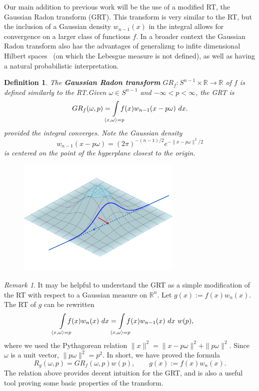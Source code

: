 \documentclass{amsart}
\newtheorem{definition}[theorem]{Definition}
\theoremstyle{remark}
\newtheorem{remark}[theorem]{Remark}
\numberwithin{equation}{section}
\newcommand{\RR}{\mathbb{R}}
\def\mclimits_#1{\limits_{\mathclap{#1}}}
\begin{document}
Our main addition to previous work will be the use of a modified RT, the Gaussian Radon transform (GRT). This transform is very similar to the RT, but the inclusion of a Gaussian density $w_{n-1}(x)$ in the integral allows for convergence on a larger class of functions $f$. In a broader context the Gaussian Radon transform also has the advantages of generalizng to infite dimensional Hilbert spaces~\cite{Seng14} (on which the Lebesgue measure is not defined), as well as having a natural probabilistic interpretation.


\begin{definition}
The \textbf{Gaussian Radon transform} $GR_f : S^{n-1} \times \RR \rightarrow \RR$ of $f$ is defined similarly to the RT.\@ Given $\omega \in S^{n-1}$ and $-\infty < p < \infty$, the GRT is
\[
    GR_f(\omega, p) = 
    \int\mclimits_{\langle x, \omega \rangle = p} f(x) w_{n-1}(x - p\omega) ~dx.
\]
provided the integral converges. Note the Gaussian density 
\[
    w_{n-1}(x - p\omega) = {(2\pi)}^{-(n-1)/2}e^{-\|x - p\omega\|^2/2}
\] 
is centered on the point of the hyperplane closest to the origin.
\end{definition}

\begin{figure}[h]
\includegraphics[width=0.7\textwidth]{geogebra-export.png}
\end{figure}

\begin{remark}
It may be helpful to understand the GRT as a simple modification of the RT with respect to a Gaussian measure on $\RR^n$. Let $g(x) := f(x)w_n(x)$. The RT of $g$ can be rewritten
\begin{align*}
    \int\mclimits_{\langle x, \omega \rangle = p} f(x) w_n(x) ~dx
    &= \int\mclimits_{\langle x, \omega \rangle = p} f(x) w_{n-1}(x) ~dx~ w(p),
\end{align*}
where we used the Pythagorean relation $\|x\|^2 = \|x - p\omega\|^2 + \|p\omega\|^2$. Since $\omega$ is a unit vector, $\|p\omega\|^2 = p^2$. In short, we have proved the formula
\begin{equation}
    \label{eq:GRTPythag}
    R_g(\omega, p) = GR_f(\omega, p) w(p), \qquad g(x) := f(x)w_n(x).
\end{equation}
The relation above provides decent intuition for the GRT, and is also a useful tool proving some basic properties of the transform.
\end{remark}
\end{document}
